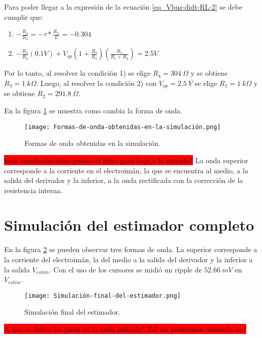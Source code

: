 Para poder llegar a la expresión de la ecuación \ref{eq_Vbus-didt-RL-2} se debe cumplir que:

\begin{enumerate}
	\item  $-\frac{R_4}{R_3}=- \tau *\frac{R_L}{L}= -0.304$  
	
	\item  $-\frac{R_4}{R_3}(0.1V)+V_{op}(1+\frac{ R_4}{R_3})(\frac{R_1}{R_1+R_2}) = 2.5V$     
\end{enumerate}

Por lo tanto, al resolver la condición 1) se elige $R_4 = 304\: \Omega$ y se obtiene $R_3=1\:k\Omega$. Luego, al resolver la condición 2) con $V_{op}=2.5\:V$ se elige $R_1=1\:k\Omega$ y se obtiene $R_{2}=291.8\:\Omega$.

En la figura \ref{fig:img_Formas_de_onda_obtenidas_en_la_simulación} se muestra como cambia la forma de onda.

\begin{figure}[H]
	\centering
	\texttt{[image: Formas-de-onda-obtenidas-en-la-simulación.png]}
	\caption{Formas de onda obtenidas en la simulación.}
	\label{fig:img_Formas_de_onda_obtenidas_en_la_simulación}
\end{figure}

\colorbox{red}{Esta simulación tiene puesto el filtro pasa bajo a la entrada?}
La onda superior corresponde a la corriente en el electroimán, la que se encuentra al medio, a la salida del derivador y la inferior, a la onda rectificada con la corrección de la resistencia interna.


\section{Simulación del estimador completo}

En la figura \ref{fig:img_Simulación_final_del_estimado} se pueden observar tres formas de onda. La superior corresponde a la corriente del electroimán, la del medio a la salida del derivador y la inferior a la salida $V_{estim}$. Con el uso de los cursores se midió un ripple de $52.66\:mV $ en $V_{estim}$.

\begin{figure}[H]
	\centering
	\texttt{[image: Simulación-final-del-estimador.png]}
	\caption{Simulación final del estimador.}
	\label{fig:img_Simulación_final_del_estimado}
\end{figure}

\colorbox{red}{A que se deben los picos en la onda pulsada? Tal ves podríamos aclararlo no?}


